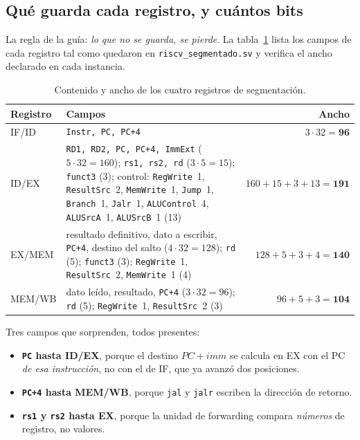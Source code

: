 \documentclass[11pt,letterpaper]{article}
\newcommand{\cod}[1]{\texttt{#1}}
\begin{document}
\subsection{Qu\'e guarda cada registro, y cu\'antos bits}
La regla de la gu\'ia: \emph{lo que no se guarda, se pierde}. La tabla~\ref{tab:anchos} lista los campos
de cada registro tal como quedaron en \cod{riscv\_segmentado.sv} y verifica el ancho declarado en
cada instancia.

\begin{table}[!htbp]
\centering\small
\begin{tabularx}{\textwidth}{@{}l X r@{}}
\toprule
\textbf{Registro} & \textbf{Campos} & \textbf{Ancho} \\
\midrule
IF/ID  & \cod{Instr, PC, PC+4} & $3\cdot 32 = \mathbf{96}$ \\
ID/EX  & \cod{RD1, RD2, PC, PC+4, ImmExt} ($5\cdot 32 = 160$); \cod{rs1, rs2, rd} ($3\cdot 5 = 15$);
         \cod{funct3} (3); control: \cod{RegWrite}~1, \cod{ResultSrc}~2, \cod{MemWrite}~1, \cod{Jump}~1,
         \cod{Branch}~1, \cod{Jalr}~1, \cod{ALUControl}~4, \cod{ALUSrcA}~1, \cod{ALUSrcB}~1 (13)
       & $160+15+3+13 = \mathbf{191}$ \\
EX/MEM & resultado definitivo, dato a escribir, \cod{PC+4}, destino del salto ($4\cdot 32 = 128$);
         \cod{rd} (5); \cod{funct3} (3); \cod{RegWrite}~1, \cod{ResultSrc}~2, \cod{MemWrite}~1 (4)
       & $128+5+3+4 = \mathbf{140}$ \\
MEM/WB & dato le\'ido, resultado, \cod{PC+4} ($3\cdot 32 = 96$); \cod{rd} (5); \cod{RegWrite}~1,
         \cod{ResultSrc}~2 (3) & $96+5+3 = \mathbf{104}$ \\
\bottomrule
\end{tabularx}
\caption{Contenido y ancho de los cuatro registros de segmentaci\'on.}
\label{tab:anchos}
\end{table}

Tres campos que sorprenden, todos presentes:
\begin{itemize}
\item \textbf{\cod{PC} hasta ID/EX}, porque el destino $PC+\mathit{imm}$ se calcula en EX con el PC
  \emph{de esa instrucci\'on}, no con el de IF, que ya avanz\'o dos posiciones.
\item \textbf{\cod{PC+4} hasta MEM/WB}, porque \cod{jal} y \cod{jalr} escriben la direcci\'on de retorno.
\item \textbf{\cod{rs1} y \cod{rs2} hasta EX}, porque la unidad de forwarding compara
  \emph{n\'umeros} de registro, no valores.
\end{itemize}
\end{document}
